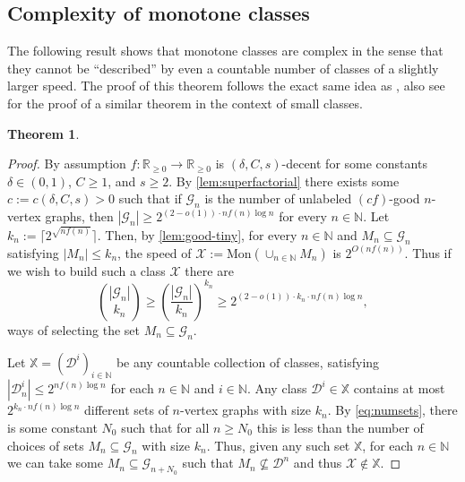 \documentclass[letterpaper,11pt]{article}
\newcommand{\dec}{decent\xspace}
\newcommand{\Nn}{\mathbb{N}}
\newcommand{\Rrr}{\mathbb{R}_{\geq 0}}
\newcommand{\Xc}{\mathcal{X}}
\newtheorem{theorem}{Theorem}[section]
\theoremstyle{definition}
\theoremstyle{remark}
\newcommand{\mon}{\mathrm{Mon}}
\renewcommand{\leq}{\leqslant}
\renewcommand{\geq}{\geqslant}
\begin{document}
	
		
	
	\subsection{Complexity of monotone classes}\label{sec:complexity}
	The following result shows that monotone classes are complex in the sense that they cannot be ``described'' by even a countable number of classes of a slightly larger speed. The proof of this theorem follows the exact same idea as \cite[Lemma 2.4]{Chandoo23}, also see \cite[Theorem 1.2]{BDSZZ23} for the proof of a similar theorem in the context of small classes. 
	
	{\renewcommand{\thetheorem}{\ref{Thm:complex}}
		\begin{theorem}
			\complex
	\end{theorem}}
	\addtocounter{theorem}{-1}
	
	
	\begin{proof}
		
		
		
		
		By assumption $f : \Rrr \rightarrow \Rrr$ is $(\delta,C,s)$-\dec  for some constants $\delta \in (0,1)$, $C\geq 1$, and $s\geq 2$. By \cref{lem:superfactorial} there exists some $c:=c(\delta,C,s)>0$ such that if $\mathcal{G}_n$ is the number of unlabeled $(cf)$-good $n$-vertex graphs, then $|\mathcal{G}_n|\geq 2^{(2-o(1))\cdot nf(n)\log n}$ for every $n \in \Nn$. Let $k_n:=\big\lceil 2^{\sqrt{nf(n)}} \big\rceil$. Then, by \cref{lem:good-tiny}, for every $n \in \Nn$ and $M_n \subseteq \mathcal{G}_n$  satisfying $|M_n| \leq k_n$,  the speed of $ \Xc := \mon(\cup_{n \in \Nn} M_n)$ is $2^{O(nf(n))}$. Thus if we wish to build such a class $\Xc$ there are \begin{equation}\label{eq:numsets}\binom{|\mathcal{G}_n|}{k_n} \geq \left(\frac{|\mathcal{G}_n|}{k_n}\right)^{k_n}  \geq 2^{(2-o(1))\cdot k_n\cdot  nf(n)\log n} ,\end{equation} ways of selecting the set $ M_n\subseteq \mathcal{G}_n$.    
		
		Let $\mathbb{X}=(\mathcal{D}^i)_{i\in \mathbb{N}}$ be any countable collection of classes, satisfying $|\mathcal{D}^i_n|\leq 2^{nf(n)\log n} $ for each $n\in \Nn$ and $i\in \Nn$. Any class $\mathcal{D}^i \in \mathbb{X}$ contains at most $2^{k_n\cdot nf(n)\log n}$ different sets of $n$-vertex graphs with size $k_n$. By \eqref{eq:numsets}, there is some constant $N_0$ such that for all $n\geq N_0$  this is less than the number of choices of sets $M_n \subseteq \mathcal{G}_n$ with size $k_n$. Thus, given any such set $\mathbb{X}$, for each $n\in \Nn$ we can take some $M_n\subseteq \mathcal{G}_{n+N_0}$ such that $M_n\not\subseteq \mathcal{D}^n$ and thus $\Xc \notin \mathbb{X}$.\end{proof}
	
\end{document}
